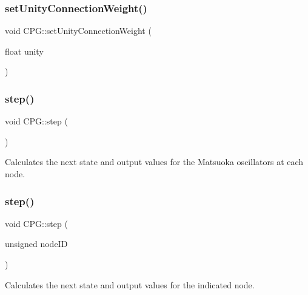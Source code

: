 \mbox{\label{classCPG_a3ba255f2cd3577c5bab856b71169b445}} 
\subsubsection{\texorpdfstring{set\+Unity\+Connection\+Weight()}{setUnityConnectionWeight()}}
{\footnotesize\ttfamily void C\+P\+G\+::set\+Unity\+Connection\+Weight (\begin{DoxyParamCaption}\item[{float}]{unity }\end{DoxyParamCaption})}

\mbox{\label{classCPG_a14fdef2f92467c2d7727c9fa0a02a07a}} 
\subsubsection{\texorpdfstring{step()}{step()}\hspace{0.1cm}{\footnotesize\ttfamily [1/2]}}
{\footnotesize\ttfamily void C\+P\+G\+::step (\begin{DoxyParamCaption}{ }\end{DoxyParamCaption})}



Calculates the next state and output values for the Matsuoka oscillators at each node. 

\mbox{\label{classCPG_ac74c71bc2a70610706b3939673a60b3a}} 
\subsubsection{\texorpdfstring{step()}{step()}\hspace{0.1cm}{\footnotesize\ttfamily [2/2]}}
{\footnotesize\ttfamily void C\+P\+G\+::step (\begin{DoxyParamCaption}\item[{unsigned}]{node\+ID }\end{DoxyParamCaption})}



Calculates the next state and output values for the indicated node. 

